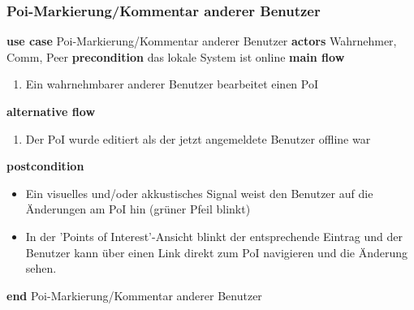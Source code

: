 \subsubsection{Poi-Markierung/Kommentar anderer Benutzer}\label{subsubsec:uc_watchpoinewornotebypeer}
\noindent \textbf{use case} Poi-Markierung/Kommentar anderer Benutzer \newline
\indent \textbf{actors} \newline
\indent \indent Wahrnehmer, Comm, Peer \newline
\indent \textbf{precondition} \newline
\indent \indent das lokale System ist online \newline
\indent \textbf{main flow}
\begin{enumerate}[labelwidth=0pt,leftmargin=39pt,noitemsep,topsep=0pt,parsep=0pt,partopsep=0pt]
\item Ein wahrnehmbarer anderer Benutzer bearbeitet einen PoI
\end{enumerate}
\indent \indent \textbf{alternative flow}
\begin{enumerate}[labelwidth=0pt,leftmargin=39pt,noitemsep,topsep=0pt,parsep=0pt,partopsep=0pt]
\item Der PoI wurde editiert als der jetzt angemeldete Benutzer offline war
\end{enumerate}
\indent \indent \textbf{postcondition}
\begin{itemize}[label={},labelwidth=0pt,leftmargin=24pt,noitemsep,topsep=0pt,parsep=0pt,partopsep=0pt]
\item Ein visuelles und/oder akkustisches Signal weist den Benutzer auf die Änderungen am PoI hin (grüner Pfeil blinkt)
\item In der 'Points of Interest'-Ansicht blinkt der entsprechende Eintrag und der Benutzer kann über einen Link direkt zum PoI navigieren und die Änderung sehen.
\end{itemize}
\noindent \textbf{end} Poi-Markierung/Kommentar anderer Benutzer


